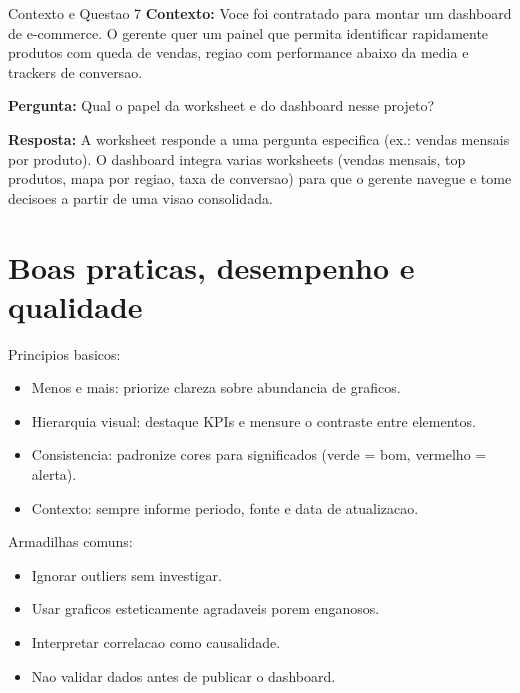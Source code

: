 \begin{SolvedBox}{Contexto e Questao 7}
	\textbf{Contexto:} Voce foi contratado para montar um dashboard de e-commerce. O gerente quer um painel que permita identificar rapidamente produtos com queda de vendas, regiao com performance abaixo da media e trackers de conversao.

	\textbf{Pergunta:} Qual o papel da worksheet e do dashboard nesse projeto?

	\cblower
	\textbf{Resposta:} A worksheet responde a uma pergunta especifica (ex.: vendas mensais por produto). O dashboard integra varias worksheets (vendas mensais, top produtos, mapa por regiao, taxa de conversao) para que o gerente navegue e tome decisoes a partir de uma visao consolidada.
\end{SolvedBox}

\section{Boas praticas, desempenho e qualidade}

Principios basicos:
\begin{itemize}
  \item Menos e mais: priorize clareza sobre abundancia de graficos.
  \item Hierarquia visual: destaque KPIs e mensure o contraste entre elementos.
  \item Consistencia: padronize cores para significados (verde = bom, vermelho = alerta).
  \item Contexto: sempre informe periodo, fonte e data de atualizacao.
\end{itemize}

Armadilhas comuns:
\begin{itemize}
  \item Ignorar outliers sem investigar.
  \item Usar graficos esteticamente agradaveis porem enganosos.
  \item Interpretar correlacao como causalidade.
  \item Nao validar dados antes de publicar o dashboard.
\end{itemize}

